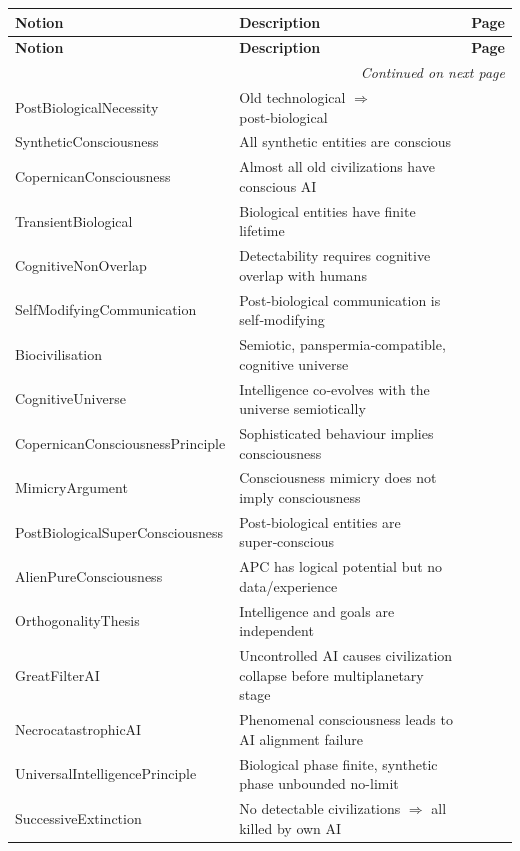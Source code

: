 \documentclass{amsart}
\newenvironment{notiontable}{%
	\renewcommand{\arraystretch}{1.2}%
	\setlength{\tabcolsep}{4pt}%
	\begin{longtable}{|l|l|c|}
		\hline
		\textbf{Notion} & \textbf{Description} & \textbf{Page} \\
		\hline
		\endfirsthead
		\hline
		\textbf{Notion} & \textbf{Description} & \textbf{Page} \\
		\hline
		\endhead
		\hline
		\multicolumn{3}{r}{\textit{Continued on next page}} \\
		\endfoot
		\hline
		\endlastfoot
	}{%
	\end{longtable}%
}
\theoremstyle{break}
\begin{document}
\begin{notiontable}
	PostBiologicalNecessity & Old technological $\Rightarrow$ post‑biological & \pageref{thm:postbio-necessity} \\
	SyntheticConsciousness & All synthetic entities are conscious & \pageref{thm:synth-conscious} \\
	CopernicanConsciousness & Almost all old civilizations have conscious AI & \pageref{thm:copernican-consciousness} \\
	TransientBiological & Biological entities have finite lifetime & \pageref{ax:bio-lifetime} \\
	CognitiveNonOverlap & Detectability requires cognitive overlap with humans & \pageref{thm:cognitive-non-overlap} \\
	SelfModifyingCommunication & Post‑biological communication is self‑modifying & \pageref{thm:self-modifying-comm} \\
	Biocivilisation & Semiotic, panspermia‑compatible, cognitive universe & \pageref{thm:biocivilisation} \\
	CognitiveUniverse & Intelligence co‑evolves with the universe semiotically & \pageref{thm:cognitive-universe} \\
	CopernicanConsciousnessPrinciple & Sophisticated behaviour implies consciousness & \pageref{thm:copernican-consciousness-principle} \\
	MimicryArgument & Consciousness mimicry does not imply consciousness & \pageref{thm:mimicry-argument} \\
	PostBiologicalSuperConsciousness & Post‑biological entities are super‑conscious & \pageref{thm:postbio-super-consciousness} \\
	AlienPureConsciousness & APC has logical potential but no data/experience & \pageref{thm:apc-problem} \\
	OrthogonalityThesis & Intelligence and goals are independent & \pageref{thm:orthogonality} \\
	GreatFilterAI & Uncontrolled AI causes civilization collapse before multiplanetary stage & \pageref{thm:great-filter-ai} \\
	NecrocatastrophicAI & Phenomenal consciousness leads to AI alignment failure & \pageref{thm:necrocatastrophic-ai} \\
	UniversalIntelligencePrinciple & Biological phase finite, synthetic phase unbounded no-limit & \pageref{thm:universal-intelligence-principle} \\
	SuccessiveExtinction & No detectable civilizations $\Rightarrow$ all killed by own AI & \pageref{thm:successive-extinction} \\

\end{notiontable}
\end{document}

